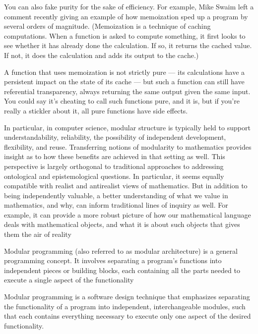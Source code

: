   You can also fake purity for the sake of efficiency. 
  For example, Mike Swaim left a comment recently giving an example of how memoization 
  sped up a program by several orders of magnitude. 
  (Memoization is a technique of caching computations. When a function is asked to compute 
  something, it first looks to see whether it has already done the calculation. If so, it returns the cached value. If not, it does the 
  calculation and adds its output to the cache.) 
  
  A function that uses memoization is not strictly pure — 
  its calculations have a persistent 
  impact on the state of its cache —
   but such a function can still have referential transparency, always returning the same output given the 
  same input. 
  You could say it’s cheating to call such functions pure, 
  and it is, but if you’re really a stickler about it, all pure 
  functions have side effects.
  
  

 
 
 









 In particular, in computer science, modular structure is typically held to
 support understandability, reliability, the possibility of independent development, flexibility, and reuse. Transferring notions of 
 modularity to mathematics
 provides insight as to how these benefits are achieved in that setting as well.
 This perspective is largely orthogonal to traditional approaches to addressing ontological and epistemological questions. In particular, it 
 seems equally
 compatible with realist and antirealist views of mathematics. But in addition
 to being independently valuable, a better understanding of what we value in
 mathematics, and why, can inform traditional lines of inquiry as well. For example, it can provide a more robust picture of how our 
 mathematical language
 deals with mathematical objects, and what it is about such objects that gives
 them the air of reality
 
 
 
 Modular programming (also referred to as modular architecture) is a general programming concept. It involves separating a program's 
 functions into independent pieces or building blocks, each containing all the parts needed to execute a single aspect of the functionality
 
 Modular programming is a software design technique that emphasizes separating the functionality of a program into independent, 
 interchangeable modules, such that each contains everything necessary to execute only one aspect of the desired functionality.
 
